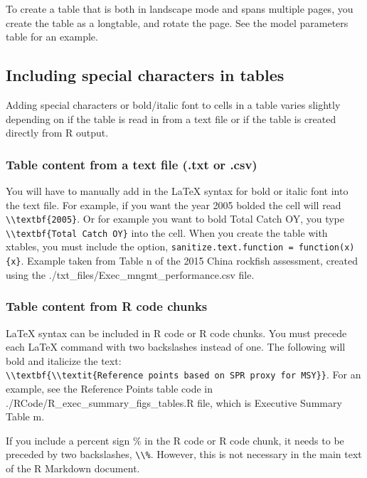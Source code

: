 \documentclass[12pt,]{article}
\begin{document}
To create a table that is both in landscape mode and spans multiple
pages, you create the table as a longtable, and rotate the page. See the
model parameters table for an example.

\subsection{Including special characters in
tables}\label{including-special-characters-in-tables}

Adding special characters or bold/italic font to cells in a table varies
slightly depending on if the table is read in from a text file or if the
table is created directly from R output.

\subsubsection{Table content from a text file (.txt or
.csv)}\label{table-content-from-a-text-file-.txt-or-.csv}

You will have to manually add in the LaTeX syntax for bold or italic
font into the text file. For example, if you want the year 2005 bolded
the cell will read
\texttt{\textbackslash{}\textbackslash{}textbf\{2005\}}. Or for example
you want to bold Total Catch OY, you type
\texttt{\textbackslash{}\textbackslash{}textbf\{Total\ Catch\ OY\}} into
the cell. When you create the table with xtables, you must include the
option, \texttt{sanitize.text.function\ =\ function(x)\{x\}}. Example
taken from Table n of the 2015 China rockfish assessment, created using
the ./txt\_files/Exec\_mngmt\_performance.csv file.

\subsubsection{Table content from R code
chunks}\label{table-content-from-r-code-chunks}

LaTeX syntax can be included in R code or R code chunks. You must
precede each LaTeX command with two backslashes instead of one. The
following will bold and italicize the text:
\texttt{\textbackslash{}\textbackslash{}textbf\{\textbackslash{}\textbackslash{}textit\{Reference\ points\ based\ on\ SPR\ proxy\ for\ MSY\}\}}.
For an example, see the Reference Points table code in
./RCode/R\_exec\_summary\_figs\_tables.R file, which is Executive
Summary Table m.

If you include a percent sign \% in the R code or R code chunk, it needs
to be preceded by two backslashes,
\texttt{\textbackslash{}\textbackslash{}\%}. However, this is not
necessary in the main text of the R Markdown document.
\end{document}
